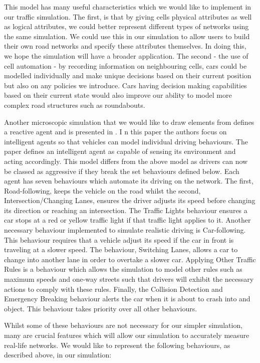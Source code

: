 \documentclass{article}
\begin{document}
	This model has many useful characteristics which we would like to implement in our traffic simulation. The first, is that by giving cells physical attributes as well as logical attributes, we could better represent different types of networks using the same simulation. 
	We could use this in our simulation to allow users to build their own road networks and specify these attributes themselves. In doing this, we hope the simulation will have a broader application. 
	The second - the use of cell automation - by recording information on neighbouring cells, cars could be modelled individually and make unique decisions based on their current position but also on any policies we introduce. 
	Cars having decision making capabilities based on their current state would also improve our ability to model more complex road structures such as roundabouts.  
	
	Another microscopic simulation that we would like to draw elements from defines a reactive agent and is presented in \cite{ehlert2001microscopic}. I
	n this paper the authors focus on intelligent agents so that vehicles can model individual driving behaviours. 
	The paper defines an intelligent agent as capable of sensing its environment and acting accordingly. This model differs from the above model as drivers can now be classed as aggressive if they break the set behaviours defined below. 
	Each agent has seven behaviours which automate its driving on the network. 
	The first, Road-following, keeps the vehicle on the road whilst the second, Intersection/Changing Lanes, ensures the driver adjusts its speed before changing its direction or reaching an intersection. 
	The Traffic Lights behaviour ensures a car stops at a red or yellow traffic light if that traffic light applies to it.  
	Another necessary behaviour implemented to simulate realistic driving is Car-following. 
	This behaviour requires that a vehicle adjust its speed if the car in front is traveling at a slower speed. 
	The behaviour, Switching Lanes, allows a car to change into another lane in order to overtake a slower car. 
	Applying Other Traffic Rules is a behaviour which allows the simulation to model other rules such as maximum speeds and one-way streets such that drivers will exhibit the necessary actions to comply with these rules. 
	Finally, the Collision Detection and Emergency Breaking behaviour alerts the car when it is about to crash into and object. 
	This behaviour takes priority over all other behaviours. 
	
	Whilst some of these behaviours are not necessary for our simpler simulation, many are crucial features which will allow our simulation to accurately measure real-life networks. 
	We would like to represent the following behaviours, as described above, in our simulation: 
	
\end{document}
